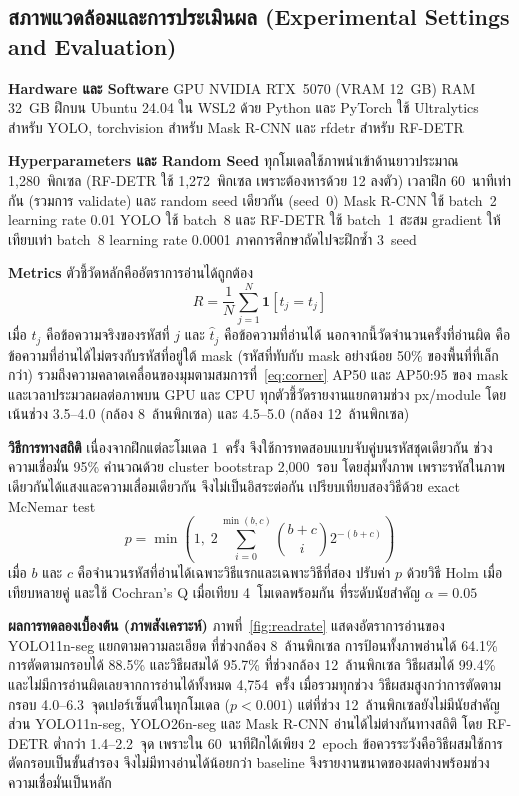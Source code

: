 \documentclass[20pt,a4paper]{article}
\begin{document}
\subsection{สภาพแวดล้อมและการประเมินผล
(Experimental Settings and Evaluation)}

\textbf{Hardware และ Software}
GPU NVIDIA RTX~5070 (VRAM 12~GB) RAM 32~GB
ฝึกบน Ubuntu 24.04 ใน WSL2 ด้วย Python และ PyTorch
ใช้ Ultralytics สำหรับ YOLO, torchvision สำหรับ Mask R-CNN
และ rfdetr สำหรับ RF-DETR

\textbf{Hyperparameters และ Random Seed}
ทุกโมเดลใช้ภาพนำเข้าด้านยาวประมาณ 1,280~พิกเซล (RF-DETR ใช้ 1,272~พิกเซล เพราะต้องหารด้วย 12 ลงตัว)
เวลาฝึก 60~นาทีเท่ากัน (รวมการ validate)
และ random seed เดียวกัน (seed~0)
Mask R-CNN ใช้ batch~2 learning rate 0.01
YOLO ใช้ batch~8
และ RF-DETR ใช้ batch~1 สะสม gradient ให้เทียบเท่า batch~8 learning rate 0.0001
ภาคการศึกษาถัดไปจะฝึกซ้ำ 3~seed

\textbf{Metrics}
ตัวชี้วัดหลักคืออัตราการอ่านได้ถูกต้อง
\begin{equation}
R = \frac{1}{N}\sum_{j=1}^{N} \mathbf{1}\!\left[\hat{t}_j = t_j\right]
\label{eq:readrate}
\end{equation}
เมื่อ $t_j$ คือข้อความจริงของรหัสที่ $j$ และ $\hat{t}_j$ คือข้อความที่อ่านได้
นอกจากนี้วัดจำนวนครั้งที่อ่านผิด
คือข้อความที่อ่านได้ไม่ตรงกับรหัสที่อยู่ใต้ mask
(รหัสที่ทับกับ mask อย่างน้อย 50\% ของพื้นที่ที่เล็กกว่า)
รวมถึงความคลาดเคลื่อนของมุมตามสมการที่~\ref{eq:corner}
AP50 และ AP50:95 ของ mask และเวลาประมวลผลต่อภาพบน GPU และ CPU
ทุกตัวชี้วัดรายงานแยกตามช่วง px/module
โดยเน้นช่วง 3.5--4.0 (กล้อง 8~ล้านพิกเซล) และ 4.5--5.0 (กล้อง 12~ล้านพิกเซล)

\textbf{วิธีการทางสถิติ}
เนื่องจากฝึกแต่ละโมเดล 1~ครั้ง จึงใช้การทดสอบแบบจับคู่บนรหัสชุดเดียวกัน
ช่วงความเชื่อมั่น 95\% คำนวณด้วย cluster bootstrap 2,000~รอบ โดยสุ่มทั้งภาพ
เพราะรหัสในภาพเดียวกันได้แสงและความเสื่อมเดียวกัน จึงไม่เป็นอิสระต่อกัน
เปรียบเทียบสองวิธีด้วย exact McNemar test
\begin{equation}
p = \min\!\left(1,\; 2\sum_{i=0}^{\min(b,c)} \binom{b+c}{i} 2^{-(b+c)}\right)
\label{eq:mcnemar}
\end{equation}
เมื่อ $b$ และ $c$ คือจำนวนรหัสที่อ่านได้เฉพาะวิธีแรกและเฉพาะวิธีที่สอง
ปรับค่า $p$ ด้วยวิธี Holm เมื่อเทียบหลายคู่
และใช้ Cochran's Q เมื่อเทียบ 4~โมเดลพร้อมกัน ที่ระดับนัยสำคัญ $\alpha = 0.05$

\textbf{ผลการทดลองเบื้องต้น (ภาพสังเคราะห์)}
ภาพที่~\ref{fig:readrate} แสดงอัตราการอ่านของ YOLO11n-seg แยกตามความละเอียด
ที่ช่วงกล้อง 8~ล้านพิกเซล การป้อนทั้งภาพอ่านได้ 64.1\%
การตัดตามกรอบได้ 88.5\% และวิธีผสมได้ 95.7\%
ที่ช่วงกล้อง 12~ล้านพิกเซล วิธีผสมได้ 99.4\%
และไม่มีการอ่านผิดเลยจากการอ่านได้ทั้งหมด 4,754~ครั้ง
เมื่อรวมทุกช่วง วิธีผสมสูงกว่าการตัดตามกรอบ 4.0--6.3~จุดเปอร์เซ็นต์ในทุกโมเดล ($p < 0.001$)
แต่ที่ช่วง 12~ล้านพิกเซลยังไม่มีนัยสำคัญ
ส่วน YOLO11n-seg, YOLO26n-seg และ Mask R-CNN อ่านได้ไม่ต่างกันทางสถิติ
โดย RF-DETR ต่ำกว่า 1.4--2.2~จุด เพราะใน 60~นาทีฝึกได้เพียง 2~epoch
ข้อควรระวังคือวิธีผสมใช้การตัดกรอบเป็นขั้นสำรอง จึงไม่มีทางอ่านได้น้อยกว่า baseline
จึงรายงานขนาดของผลต่างพร้อมช่วงความเชื่อมั่นเป็นหลัก
\end{document}
